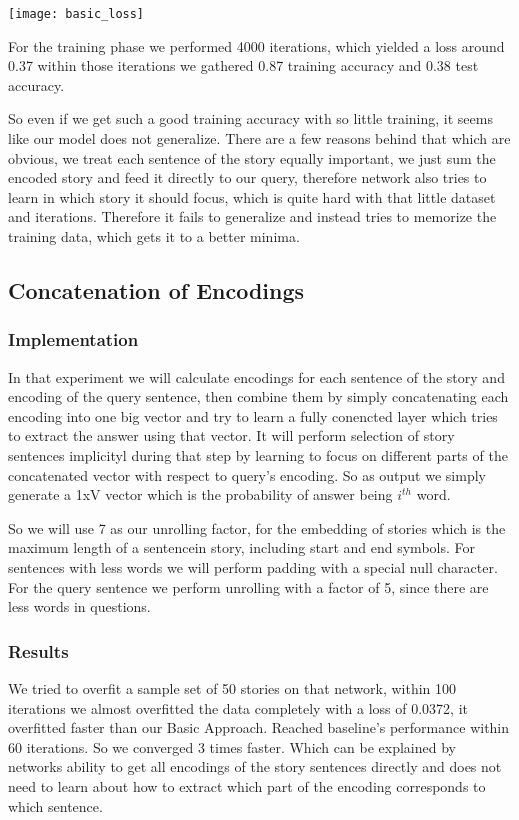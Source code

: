 \documentclass[conference,compsoc]{IEEEtran}
\begin{document}
\texttt{[image: basic\_loss]}

For the training phase we performed 4000 iterations, which yielded a loss around 0.37
within those iterations we gathered 0.87 training accuracy and 0.38 test accuracy.

So even if we get such a good training accuracy with so little training, it seems like
our model does not generalize. There are a few reasons behind that which are obvious,
we treat each sentence of the story equally important, we just sum the encoded story
and feed it directly to our query, therefore network also tries to learn in which
story it should focus, which is quite hard with that little dataset and iterations.
Therefore it fails to generalize and instead tries to memorize the training data,
which gets it to a better minima.

\subsection{Concatenation of Encodings}
\subsubsection{Implementation}
In that experiment we will calculate encodings for each sentence of the story and
encoding of the query sentence, then combine them by simply concatenating each
encoding into one big vector and try to learn a fully conencted layer which tries
to extract the answer using that vector. It will perform selection of story sentences
implicityl during that step by learning to focus on different parts of the concatenated 
vector with respect to query's encoding. So as output we simply generate a 1xV vector
which is the probability of answer being $i^{th}$ word.

So we will use 7 as our unrolling factor, for the embedding of stories which is the 
maximum length of a sentencein story, including start and end symbols. 
For sentences with less words we will perform padding with a special null character. 
For the query sentence we perform unrolling with a factor of 5, since there are less 
words in questions.

\subsubsection{Results}
We tried to overfit a sample set of 50 stories on that network, within 100 iterations
we almost overfitted the data completely with a loss of 0.0372, it overfitted faster than
our Basic Approach. Reached baseline's performance within 60 iterations. So we converged 3
times faster. Which can be explained by networks ability to get all encodings of the story
sentences directly and does not need to learn about how to extract which part of the encoding
corresponds to which sentence.
\end{document}

